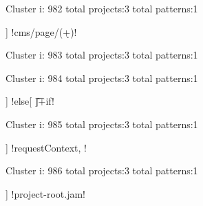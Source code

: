 Cluster i: 982
total projects:3
total patterns:1
\begin{multicols}{1}
\begin{description}[noitemsep,topsep=0pt]
\item [[3] ] \cverb!cms/page/(\d+)!
\end{description}
\end{multicols}







Cluster i: 983
total projects:3
total patterns:1
\begin{multicols}{1}
\end{multicols}







Cluster i: 984
total projects:3
total patterns:1
\begin{multicols}{1}
\begin{description}[noitemsep,topsep=0pt]
\item [[3] ] \cverb!else[ \f\t]+if!
\end{description}
\end{multicols}







Cluster i: 985
total projects:3
total patterns:1
\begin{multicols}{1}
\begin{description}[noitemsep,topsep=0pt]
\item [[3] ] \cverb!requestContext, !
\end{description}
\end{multicols}







Cluster i: 986
total projects:3
total patterns:1
\begin{multicols}{1}
\begin{description}[noitemsep,topsep=0pt]
\item [[3] ] \cverb!project-root.jam!
\end{description}
\end{multicols}







